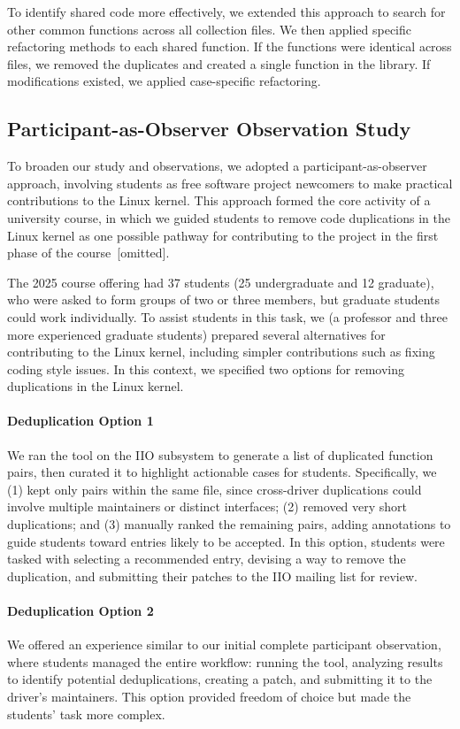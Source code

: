 \documentclass[10pt,conference]{IEEEtran}
\begin{document}
To identify shared code more effectively, we extended this approach to search for other common functions across all collection files. We then applied specific refactoring methods to each shared function. If the functions were identical across files, we removed the duplicates and created a single function in the library. If modifications existed, we applied case-specific refactoring.

\subsection{Participant-as-Observer Observation Study}

To broaden our study and observations, we adopted a participant-as-observer approach, involving students as free software project newcomers to make practical contributions to the Linux kernel. This approach formed the core activity of a university course, in which we guided students to remove code duplications in the Linux kernel as one possible pathway for contributing to the project in the first phase of the course~[omitted].

The 2025 course offering had 37 students (25 undergraduate and 12 graduate), who were asked to form groups of two or three members, but graduate students could work individually. To assist students in this task, we (a professor and three more experienced graduate students) prepared several alternatives for contributing to the Linux kernel, including simpler contributions such as fixing coding style issues. In this context, we specified two options for removing duplications in the Linux kernel.

\paragraph*{\textbf{Deduplication Option 1}} We ran the tool on the IIO subsystem to generate a list of duplicated function pairs, then curated it to highlight actionable cases for students. Specifically, we (1) kept only pairs within the same file, since cross-driver duplications could involve multiple maintainers or distinct interfaces; (2) removed very short duplications; and (3) manually ranked the remaining pairs, adding annotations to guide students toward entries likely to be accepted. In this option, students were tasked with selecting a recommended entry, devising a way to remove the duplication, and submitting their patches to the IIO mailing list for review.

\paragraph*{\textbf{Deduplication Option 2}} We offered an experience similar to our initial complete participant observation, where students managed the entire workflow: running the tool, analyzing results to identify potential deduplications, creating a patch, and submitting it to the driver's maintainers. This option provided freedom of choice but made the students' task more complex.
\end{document}
